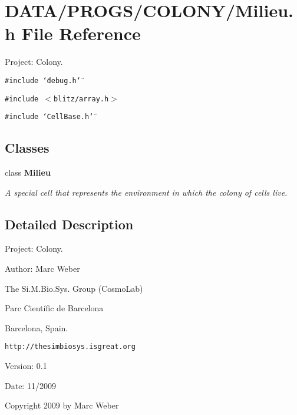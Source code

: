 \section{DATA/PROGS/COLONY/Milieu.h File Reference}
\label{Milieu_8h}
Project: Colony. 

{\tt \#include \char`\"{}debug.h\char`\"{}}\par
{\tt \#include $<$blitz/array.h$>$}\par
{\tt \#include \char`\"{}CellBase.h\char`\"{}}\par
\subsection*{Classes}
\begin{CompactItemize}
\item 
class {\bf Milieu}
\begin{CompactList}\small\item\em A special cell that represents the environment in which the colony of cells live. \item\end{CompactList}\end{CompactItemize}


\subsection{Detailed Description}
Project: Colony. 

\begin{Desc}
\item[Author:]Marc Weber\par
 The Si.M.Bio.Sys. Group (CosmoLab)\par
 Parc Científic de Barcelona\par
 Barcelona, Spain.\par
 {\tt http://thesimbiosys.isgreat.org} \end{Desc}
\begin{Desc}
\item[Version:]0.1 \end{Desc}
\begin{Desc}
\item[Date:]11/2009\end{Desc}
Copyright 2009 by Marc Weber 